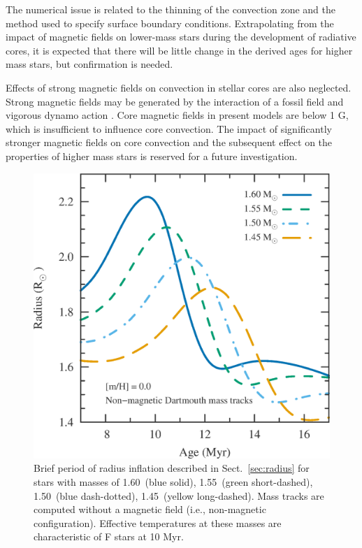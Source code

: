 \documentclass{aa}
\begin{document}
The numerical issue is related to the thinning of the convection zone and the method used to specify surface boundary conditions. 
Extrapolating from the impact of magnetic fields on lower-mass stars during the development of radiative cores, it is expected that there will be little change in the derived ages for higher mass stars, but confirmation is needed.

Effects of strong magnetic fields on convection in stellar cores are also neglected. Strong magnetic fields may be generated by the interaction of a fossil field and vigorous dynamo action \citep[e.g.,][]{Featherstone2009}. Core magnetic fields in present models are below 1 G, which is insufficient to influence core convection. The impact of significantly stronger magnetic fields on core convection and the subsequent effect on the properties of higher mass stars is reserved for a future investigation. 

\begin{figure}
    \centering
    \includegraphics[width=0.85\linewidth]{radius_bump.eps}
    \caption{Brief period of radius inflation described in Sect.~\ref{sec:radius} for stars with masses of 1.60\msun\ (blue solid), 1.55\msun\ (green short-dashed), 1.50\msun\ (blue dash-dotted), 1.45\msun\ (yellow long-dashed). Mass tracks are computed without a magnetic field (i.e., non-magnetic configuration). Effective temperatures at these masses are characteristic of F stars at 10 Myr.}
    \label{fig:bump}
\end{figure}
\end{document}
